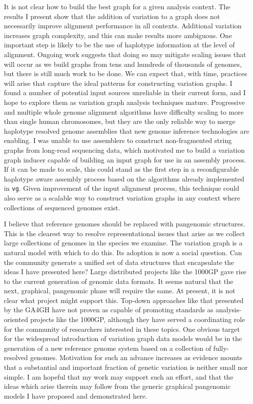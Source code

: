 It is not clear how to build the best graph for a given analysis context.
The results I present show that the addition of variation to a graph does not necessarily improve alignment performance in all contexts.
Additional variation increases graph complexity, and this can make results more ambiguous.
One important step is likely to be the use of haplotype information at the level of alignment.
Ongoing work suggests that doing so may mitigate scaling issues that will occur as we build graphs from tens and hundreds of thousands of genomes, but there is still much work to be done.
We can expect that, with time, practices will arise that capture the ideal patterns for constructing variation graphs.
I found a number of potential input sources unreliable in their current form, and I hope to explore them as variation graph analysis techniques mature.
Progressive and multiple whole genome alignment algorithms have difficulty scaling to more than single human chromosomes, but they are the only reliable way to merge haplotype resolved genome assemblies that new genome inference technologies are enabling.
I was unable to use assemblers to construct non-fragmented string graphs from long-read sequencing data, which motivated me to build a variation graph inducer capable of building an input graph for use in an assembly process.
If it can be made to scale, this could stand as the first step in a reconfigurable haplotype aware assembly process based on the algorithms already implemented in {\tt vg}.
Given improvement of the input alignment process, this technique could also serve as a scalable way to construct variation graphs in any context where collections of sequenced genomes exist.

I believe that reference genomes should be replaced with pangenomic structures.
This is the clearest way to resolve representational issues that arise as we collect large collections of genomes in the species we examine.
The variation graph is a natural model with which to do this.
Its adoption is now a social question.
Can the community generate a unified set of data structures that encapsulate the ideas I have presented here?
Large distributed projects like the 1000GP gave rise to the current generation of genomic data formats.
It seems natural that the next, graphical, pangenomic phase will require the same.
At present, it is not clear what project might support this.
Top-down approaches like that presented by the GA4GH have not proven as capable of promoting standards as analysis-oriented projects like the 1000GP, although they have served a coordinating role for the community of researchers interested in these topics.
One obvious target for the widespread introduction of variation graph data models would be in the generation of a new reference genome system based on a collection of fully-resolved genomes.
Motivation for such an advance increases as evidence mounts that a substantial and important fraction of genetic variation is neither small nor simple.
I am hopeful that my work may support such an effort, and that the ideas which arise therein may follow from the generic graphical pangenomic models I have proposed and demonstrated here.
